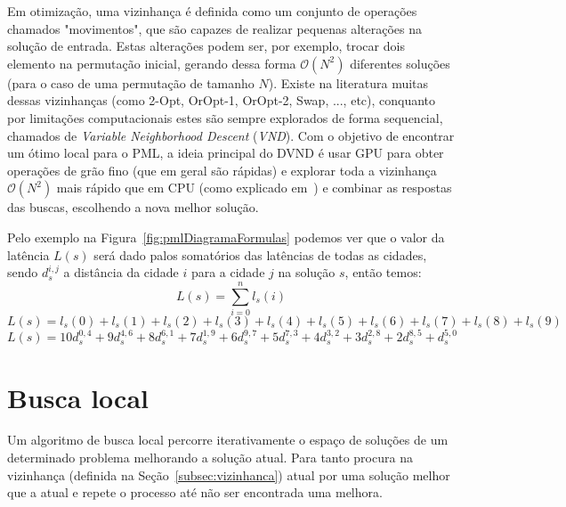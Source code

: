 Em otimização, uma vizinhança é definida como um conjunto de operações chamados "movimentos", que são capazes de realizar pequenas alterações na solução de entrada.
Estas alterações podem ser, por exemplo, trocar dois elemento na permutação inicial, gerando dessa forma $\mathcal{O}(N^2)$ diferentes soluções (para o caso de uma permutação de tamanho $N$). Existe na literatura muitas dessas vizinhanças (como 2-Opt, OrOpt-1, OrOpt-2, Swap, ..., etc), conquanto por limitações computacionais estes são sempre explorados de forma sequencial, chamados de \emph{Variable Neighborhood Descent} (\emph{VND}).
Com o objetivo de encontrar um ótimo local para o PML, a ideia principal do DVND é usar GPU para obter operações de grão fino (que em geral são rápidas) e explorar toda a vizinhança $\mathcal{O}(N^2)$ mais rápido que em CPU (como explicado em~\cite{wamca2016}) e combinar as respostas das buscas, escolhendo a nova melhor solução.



Pelo exemplo na Figura~\ref{fig:pmlDiagramaFormulas} podemos ver que o valor da latência $L(s)$ será dado palos somatórios das latências de todas as cidades, sendo $d_s^{i, j}$ a distância da cidade $i$ para a cidade $j$ na solução $s$, então temos:
$$ L(s) = \sum_{i=0}^n{l_s(i)} $$
$$ L(s) = l_s(0) + l_s(1) + l_s(2) + l_s(3) + l_s(4) + l_s(5) + l_s(6) + l_s(7) + l_s(8) + l_s(9) $$
$$ L(s) = 10d_s^{0, 4} + 9d_s^{4, 6} + 8d_s^{6, 1} + 7d_s^{1, 9} + 6d_s^{9, 7} + 5d_s^{7, 3} + 4d_s^{3, 2} + 3d_s^{2, 8} + 2d_s^{8, 5} + d_s^{5, 0}$$

\section{Busca local} \label{sec:buscaLocal}

Um algoritmo de busca local percorre iterativamente o espaço de soluções de um determinado problema melhorando a solução atual.
Para tanto procura na vizinhança (definida na Seção~\ref{subsec:vizinhanca}) atual por uma solução melhor que a atual e repete o processo até não ser encontrada uma melhora.

